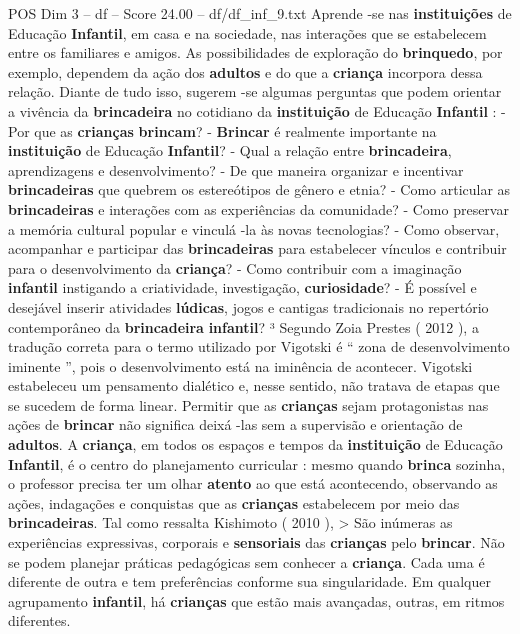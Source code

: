 \begin{textsample}{POS Dim 3 – df – Score 24.00 – df/df\_inf\_9.txt}
Aprende -se nas \textbf{instituições} de Educação \textbf{Infantil}, em casa e na sociedade, nas interações que se estabelecem entre os familiares e amigos.
As possibilidades de exploração do \textbf{brinquedo}, por exemplo, dependem da ação dos \textbf{adultos} e do que a \textbf{criança} incorpora dessa relação.
Diante de tudo isso, sugerem -se algumas perguntas que podem orientar a vivência da \textbf{brincadeira} no cotidiano da \textbf{instituição} de Educação \textbf{Infantil} : - Por que as \textbf{crianças} \textbf{brincam}? - \textbf{Brincar} é realmente importante na \textbf{instituição} de Educação \textbf{Infantil}? - Qual a relação entre \textbf{brincadeira}, aprendizagens e desenvolvimento? - De que maneira organizar e incentivar \textbf{brincadeiras} que quebrem os estereótipos de gênero e etnia? - Como articular as \textbf{brincadeiras} e interações com as experiências da comunidade? - Como preservar a memória cultural popular e vinculá -la às novas tecnologias? - Como observar, acompanhar e participar das \textbf{brincadeiras} para estabelecer vínculos e contribuir para o desenvolvimento da \textbf{criança}? - Como contribuir com a imaginação \textbf{infantil} instigando a criatividade, investigação, \textbf{curiosidade}? - É possível e desejável inserir atividades \textbf{lúdicas}, jogos e cantigas tradicionais no repertório contemporâneo da \textbf{brincadeira} \textbf{infantil}? ³ Segundo Zoia Prestes ( 2012 ), a tradução correta para o termo utilizado por Vigotski é “ zona de desenvolvimento iminente ”, pois o desenvolvimento está na iminência de acontecer.
Vigotski estabeleceu um pensamento dialético e, nesse sentido, não tratava de etapas que se sucedem de forma linear.
Permitir que as \textbf{crianças} sejam protagonistas nas ações de \textbf{brincar} não significa deixá -las sem a supervisão e orientação de \textbf{adultos}.
A \textbf{criança}, em todos os espaços e tempos da \textbf{instituição} de Educação \textbf{Infantil}, é o centro do planejamento curricular : mesmo quando \textbf{brinca} sozinha, o professor precisa ter um olhar \textbf{atento} ao que está acontecendo, observando as ações, indagações e conquistas que as \textbf{crianças} estabelecem por meio das \textbf{brincadeiras}.
Tal como ressalta Kishimoto ( 2010 ), > São inúmeras as experiências expressivas, corporais e \textbf{sensoriais} das \textbf{crianças} pelo \textbf{brincar}.
Não se podem planejar práticas pedagógicas sem conhecer a \textbf{criança}.
Cada uma é diferente de outra e tem preferências conforme sua singularidade.
Em qualquer agrupamento \textbf{infantil}, há \textbf{crianças} que estão mais avançadas, outras, em ritmos diferentes.

\end{textsample}
